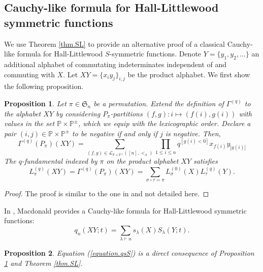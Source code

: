 \documentclass[revision]{FPSAC2024}
\newtheorem{proposition}{Proposition}
\newcommand{\la}{\lambda}
\newcommand{\PP}{\mathbb{P}} %
\begin{document}
\subsection{Cauchy-like formula for Hall-Littlewood symmetric functions}
We use Theorem \ref{thm.SL} to provide an alternative proof of a classical Cauchy-like formula for Hall-Littlewood $S$-symmetric functions. Denote $Y=\{y_1, y_2, \dots \}$ an additional alphabet of commutating indeterminates independent of and commuting with $X$. Let $XY = \{x_iy_j\}_{i,j}$ be the product alphabet. We first show the following proposition.
\begin{proposition}
\label{prop.LLL}
Let $\pi \in \mathfrak{S}_n$ be a permutation. Extend the definition of $\Gamma^{(q)}$ to the alphabet $XY$ by considering $P_{\pi}$-partitions $(f,g): i \mapsto (f(i), g(i))$ with values in the set $\PP \times \PP^\pm$, which we equip with the lexicographic order. Declare a pair $(i,j) \in \PP \times \PP^\pm$ to be negative if and only if $j$ is negative. Then,
\begin{equation*}
 \Gamma^{(q)}(P_\pi)(XY) = \sum_{(f,g)\in\mathcal{L}_{\PP \times \PP^\pm}([n],<_{\pi})} \prod_{1\leq i\leq n}q^{[g(i)<0]}x_{f(i)}y_{|g(i)|}
 \end{equation*}
The $q$-fundamental indexed by $\pi$ on the product alphabet $XY$ satisfies
\begin{equation}
L^{(q)}_\pi(XY) = \Gamma^{(q)}(P_\pi)(XY) = \sum_{\sigma \circ \tau = \pi}L^{(0)}_\sigma(X)L^{(q)}_\tau(Y).
\end{equation}
\end{proposition}
\begin{proof}
The proof is similar to the one in \cite[thm 6.11]{Pet07} and not detailed here.  
\end{proof}
\noindent In \cite[III. 4. Eq. (4.7)]{Mac99}, Macdonald provides a Cauchy-like formula for Hall-Littlewood symmetric functions:
\begin{equation}
\label{equation.qsS}
q_{n}(XY;t) = \sum_{\la \vdash n}s_\la(X)S_\la(Y;t).
\end{equation}
\begin{proposition}
Equation (\ref{equation.qsS}) is a direct consequence of Proposition \ref{prop.LLL} and Theorem \ref{thm.SL}.
\end{proposition}
\end{document}
